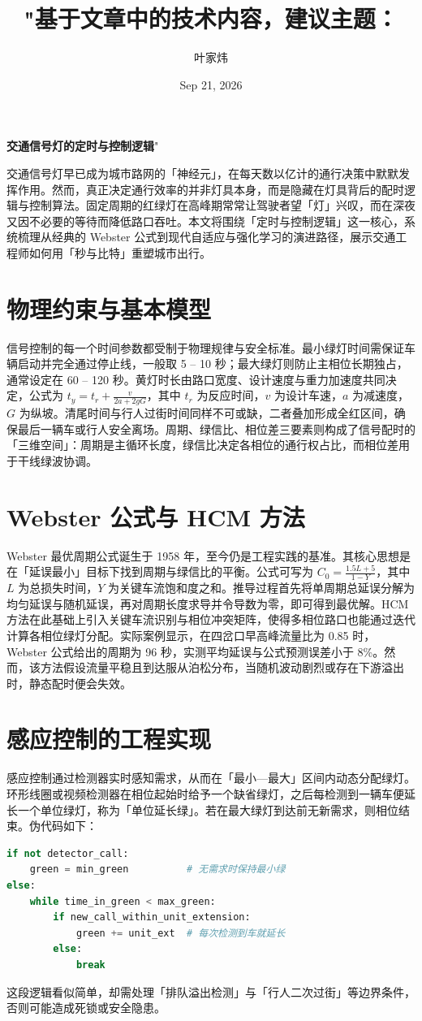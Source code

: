 \title{"基于文章中的技术内容，建议主题：}
\author{叶家炜}
\date{Sep 21, 2026}
\maketitle
\textbf{交通信号灯的定时与控制逻辑}"\par
交通信号灯早已成为城市路网的「神经元」，在每天数以亿计的通行决策中默默发挥作用。然而，真正决定通行效率的并非灯具本身，而是隐藏在灯具背后的配时逻辑与控制算法。固定周期的红绿灯在高峰期常常让驾驶者望「灯」兴叹，而在深夜又因不必要的等待而降低路口吞吐。本文将围绕「定时与控制逻辑」这一核心，系统梳理从经典的 Webster 公式到现代自适应与强化学习的演进路径，展示交通工程师如何用「秒与比特」重塑城市出行。\par
\chapter{物理约束与基本模型}
信号控制的每一个时间参数都受制于物理规律与安全标准。最小绿灯时间需保证车辆启动并完全通过停止线，一般取 5 – 10 秒；最大绿灯则防止主相位长期独占，通常设定在 60 – 120 秒。黄灯时长由路口宽度、设计速度与重力加速度共同决定，公式为 $t_y = t_r + \frac{v}{2a + 2gG}$，其中 $t_r$ 为反应时间，$v$ 为设计车速，$a$ 为减速度，$G$ 为纵坡。清尾时间与行人过街时间同样不可或缺，二者叠加形成全红区间，确保最后一辆车或行人安全离场。周期、绿信比、相位差三要素则构成了信号配时的「三维空间」：周期是主循环长度，绿信比决定各相位的通行权占比，而相位差用于干线绿波协调。\par
\chapter{Webster 公式与 HCM 方法}
Webster 最优周期公式诞生于 1958 年，至今仍是工程实践的基准。其核心思想是在「延误最小」目标下找到周期与绿信比的平衡。公式可写为 $C_0 = \frac{1.5L + 5}{1 - Y}$，其中 $L$ 为总损失时间，$Y$ 为关键车流饱和度之和。推导过程首先将单周期总延误分解为均匀延误与随机延误，再对周期长度求导并令导数为零，即可得到最优解。HCM 方法在此基础上引入关键车流识别与相位冲突矩阵，使得多相位路口也能通过迭代计算各相位绿灯分配。实际案例显示，在四岔口早高峰流量比为 0.85 时，Webster 公式给出的周期为 96 秒，实测平均延误与公式预测误差小于 8\%{}。然而，该方法假设流量平稳且到达服从泊松分布，当随机波动剧烈或存在下游溢出时，静态配时便会失效。\par
\chapter{感应控制的工程实现}
感应控制通过检测器实时感知需求，从而在「最小—最大」区间内动态分配绿灯。环形线圈或视频检测器在相位起始时给予一个缺省绿灯，之后每检测到一辆车便延长一个单位绿灯，称为「单位延长绿」。若在最大绿灯到达前无新需求，则相位结束。伪代码如下：\par
\begin{lstlisting}[language=python]
if not detector_call:
    green = min_green          # 无需求时保持最小绿
else:
    while time_in_green < max_green:
        if new_call_within_unit_extension:
            green += unit_ext  # 每次检测到车就延长
        else:
            break
\end{lstlisting}
这段逻辑看似简单，却需处理「排队溢出检测」与「行人二次过街」等边界条件，否则可能造成死锁或安全隐患。\par
